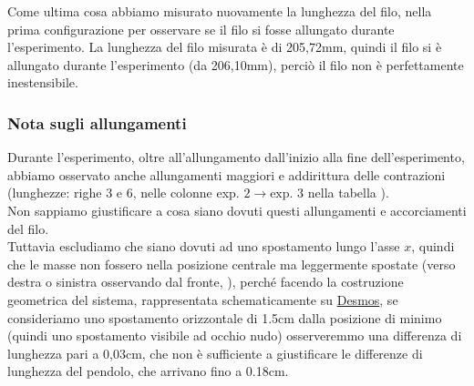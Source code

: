 Come ultima cosa abbiamo misurato nuovamente la lunghezza del filo, nella prima configurazione per osservare se il filo si fosse allungato durante l'esperimento. La lunghezza del filo misurata è di 205,72mm, quindi il filo si è allungato durante l'esperimento (da 206,10mm), perciò il filo non è perfettamente inestensibile.\\

\subsubsection*{Nota sugli allungamenti}
Durante l'esperimento, oltre all'allungamento dall'inizio alla fine dell'esperimento, abbiamo osservato anche allungamenti maggiori e addirittura delle contrazioni (lunghezze: righe 3 e 6, nelle colonne exp. $2\to \text{exp. }3$ nella tabella ).\\
Non sappiamo giustificare a cosa siano dovuti questi allungamenti e accorciamenti del filo.\\
Tuttavia escludiamo che siano dovuti ad uno spostamento lungo l'asse $x$, quindi che le masse non fossero nella posizione centrale ma leggermente spostate (verso destra o sinistra osservando dal fronte, ), perché facendo la costruzione geometrica del sistema, rappresentata schematicamente su \href{https://www.desmos.com/calculator/hlyr1xp9xh}{Desmos}, se consideriamo uno spostamento orizzontale di 1.5cm dalla posizione di minimo (quindi uno spostamento visibile ad occhio nudo) osserveremmo una differenza di lunghezza pari a 0,03cm, che non è sufficiente a giustificare le differenze di lunghezza del pendolo, che arrivano fino a 0.18cm.\\
